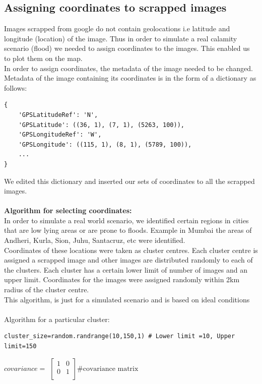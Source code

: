 \documentclass[12pt]{article}
\begin{document}
\subsection{Assigning coordinates to scrapped images}
Images scrapped from google do not contain geolocations i.e latitude and longitude (location) of the image. Thus in order to simulate a real calamity scenario (flood) we needed to assign coordinates to the images. This enabled us to plot them on the map.\\
In order to assign coordinates, the metadata of the image needed to be changed. Metadata of the image containing its coordinates is in the form of a dictionary as follows:\\
\begin{lstlisting}
{
    'GPSLatitudeRef': 'N',
    'GPSLatitude': ((36, 1), (7, 1), (5263, 100)),
    'GPSLongitudeRef': 'W',
    'GPSLongitude': ((115, 1), (8, 1), (5789, 100)),
    ...
}
\end{lstlisting}
We edited this dictionary and inserted our sets of coordinates to all the scrapped images.\\ 
\\\textbf{Algorithm for selecting coordinates:}\\
In order to simulate a real world scenario, we identified certain regions in cities that are low lying areas or are prone to floods. Example in Mumbai the areas of Andheri, Kurla, Sion, Juhu, Santacruz, etc were identified.\\
Coordinates of these locations were taken as cluster centres.
Each cluster centre is assigned a scrapped image and other images are distributed randomly to each of the clusters. Each cluster has a certain lower limit of number of images and an upper limit. 
Coordinates for the images were assigned randomly within 2km radius of the cluster centre.\\
This algorithm, is just for a simulated scenario and is based on ideal conditions\\
\\Algorithm for a particular cluster:
\begin{lstlisting}
cluster_size=random.randrange(10,150,1) # Lower limit =10, Upper limit=150
\end{lstlisting}
$covariance = $
$\begin{bmatrix}
1 & 0\\
0 & 1\\ 
\end{bmatrix}\text{\# covariance matrix}$
\end{document}
